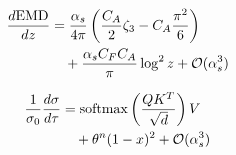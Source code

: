 \begin{align}
  \frac{d \mathrm{EMD}}{d z} &= \frac{\alpha_s}{4\pi} \left( \frac{C_A}{2} \zeta_{3} - C_A \frac{\pi^2}{6} \right) \nonumber \\
  &\quad + \frac{\alpha_s C_F C_A}{\pi} \log^2 z + \mathcal{O}(\alpha_s^3) \label{eq:3}
\end{align}

\begin{align}
  \frac{1}{\sigma_0} \frac{d\sigma}{d\tau} &= \mathrm{softmax}\left(\frac{Q K^T}{\sqrt{d}}\right) V \nonumber \\
  &\quad + {\theta}^{n} (1 - x)^{2} + \mathcal{O}(\alpha_s^3) \label{eq:4}
\end{align}

